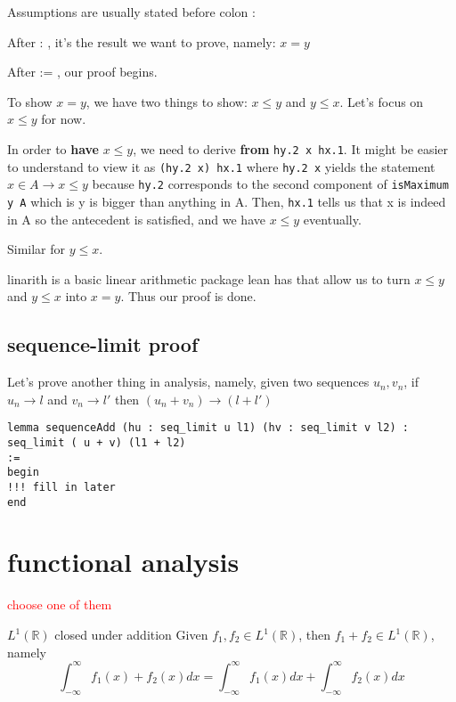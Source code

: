 \documentclass[a4paper]{article}
\newcommand{\R}{\mathbb{R}}
\begin{document}
Assumptions are usually stated before colon :

After : , it's the result we want to prove, namely: $x = y$

After := , our proof begins.

To show $x = y$, we have two things to show:  $x \le y$ and $y \le x$. Let's focus on $x \le y$ for now.

In order to \textbf{have} $x \le y$, we need to derive \textbf{from} \texttt{hy.2 x hx.1}. It might be easier to understand to view it as \texttt{(hy.2 x) hx.1} where \texttt{hy.2 x} yields the statement $x \in A \to  x\le y$ because \texttt{hy.2} corresponds to the second component of \texttt{isMaximum y A} which is y is bigger than anything in A. Then, \texttt{hx.1} tells us that x is indeed in A so the antecedent is satisfied, and we have $ x \le y$ eventually.

Similar for $y \le x$.

linarith is a basic linear arithmetic package lean has that allow us to turn $ x \le y$ and $y \le x$ into $x =y$. Thus our proof is done.

\newpage
\subsection{sequence-limit proof}

Let's prove another thing in analysis, namely, given two sequences $u_n, v_n$, if $u_n \to l$ and $v_n \to l'$ then $(u_n + v_n) \to (l+l')$

\begin{listing}[!h]
\begin{verbatim}
lemma sequenceAdd (hu : seq_limit u l1) (hv : seq_limit v l2) :
seq_limit ( u + v) (l1 + l2)
:=
begin
!!! fill in later
end
\end{verbatim}
\end{listing}

\section{functional analysis}
\textcolor{red}{choose one of them}

\begin{Theorem}{$L^1(\R)$ closed under addition}{}
	Given $f_1, f_2 \in L^1(\R)$, then $f_1+f_2 \in L^1(\R)$, namely \[
		\int_{-\infty}^{\infty} f_1(x) + f_2(x) dx = \int_{-\infty}^{\infty} f_1(x) dx + \int_{-\infty}^{\infty} f_2(x) dx
	\] 
\end{Theorem}
\end{document}
